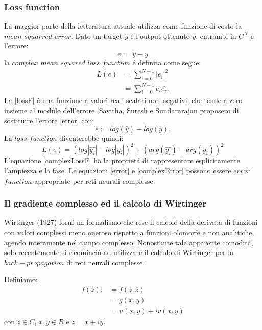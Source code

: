 \documentclass[a4paper,10pt]{article}
\begin{document}
 \subsubsection{Loss function}
 La maggior parte della letteratura attuale utilizza come funzione di costo la $mean$ $squarred$ $error$. Dato un target $\widehat{y}$ e l'output ottenuto $y$, entrambi in $C^N$ e l'errore: 
 \begin{equation}
  e:=\widehat{y}-y \label{error}
 \end{equation}
 la $complex$ $mean$ $squared$ $loss$ $function$ \'e definita come segue:
 \begin{align}
  L(e) &= \sum_{i=0}^{N-1} \left| e_i\right|^2\label{lossF}\\
  &=\sum_{i=0}^{N-1} e_i \overline{e_i}.
 \end{align}
 La \ref{lossF} \'e una funzione a valori reali scalari non negativi, che tende a zero insieme al modulo dell'errore. Savitha, Suresh e Sundararajan \cite{savitha2009new} proposero di sostituire l'errore \ref{error} con:
 \begin{equation}
  e:=log ( \widehat{y} ) - log ( y ).\label{complexError}
 \end{equation}
 La $loss$ $function$ diventerebbe quindi:
 \begin{equation}
  L(e)=\left( log\left| \widehat{y_i}\right|-log\left| y_i\right|\right)^2 + \left(arg( \widehat{y_i}) - arg  (y_i)\right)^2 \label{complexLossF}
 \end{equation}
 L'equazione \ref{complexLossF} ha la propriet\'a di rappresentare esplicitamente l'ampiezza e la fase.
 Le equazioni \ref{error} e \ref{complexError} possono essere $error$ $function$ appropriate per reti neurali complesse.
 
 \subsubsection{Il gradiente complesso ed il calcolo di Wirtinger}
 Wirtinger (1927) \cite{wirtinger1927formalen} forn\'i un formalismo che rese il calcolo della derivata di funzioni con valori complessi meno oneroso rispetto a funzioni olomorfe e non analitiche, agendo interamente nel campo complesso. Nonostante tale apparente comodit\'a, solo recentemente si ricominci\'o ad utilizzare il calcolo di Wirtinger per la $back-propagation$ di reti neurali complesse. 

 Definiamo:
 \begin{align}
  f(z) : &= f\left( z,\overline{z}\right)\\
  &= g\left( x,y\right)\\
  &= u\left( x,y\right) +iv\left( x,y\right)
 \end{align}
 con $z\in C$, $x,y\in R$ e $z=x+iy$. 
\end{document}
